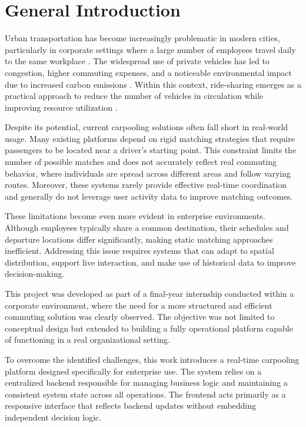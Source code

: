\chapter*{General Introduction}
Urban transportation has become increasingly problematic in modern cities, particularly in corporate settings where a large number of employees travel daily to the same workplace \cite{worldbank_transport}. The widespread use of private vehicles has led to congestion, higher commuting expenses, and a noticeable environmental impact due to increased carbon emissions \cite{iea_transport}. Within this context, ride-sharing emerges as a practical approach to reduce the number of vehicles in circulation while improving resource utilization \cite{agatz2012optimization}.

Despite its potential, current carpooling solutions often fall short in real-world usage. Many existing platforms depend on rigid matching strategies that require passengers to be located near a driver’s starting point. This constraint limits the number of possible matches and does not accurately reflect real commuting behavior, where individuals are spread across different areas and follow varying routes. Moreover, these systems rarely provide effective real-time coordination and generally do not leverage user activity data to improve matching outcomes.

These limitations become even more evident in enterprise environments. Although employees typically share a common destination, their schedules and departure locations differ significantly, making static matching approaches inefficient. Addressing this issue requires systems that can adapt to spatial distribution, support live interaction, and make use of historical data to improve decision-making.

This project was developed as part of a final-year internship conducted within a corporate environment, where the need for a more structured and efficient commuting solution was clearly observed. The objective was not limited to conceptual design but extended to building a fully operational platform capable of functioning in a real organizational setting.

To overcome the identified challenges, this work introduces a real-time carpooling platform designed specifically for enterprise use. The system relies on a centralized backend responsible for managing business logic and maintaining a consistent system state across all operations. The frontend acts primarily as a responsive interface that reflects backend updates without embedding independent decision logic.

